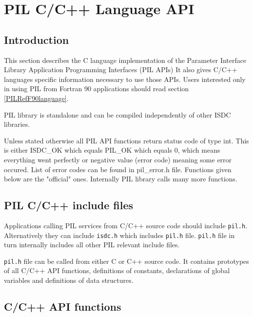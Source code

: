 \section{PIL C/C++ Language API}\label{PILRefClanguage}
%

\subsection{Introduction}\label{PILRefCintro}

This  section  describes  the  C language implementation of the
Parameter Interface Library Application Programming Interfaces (PIL APIs)
It also gives C/C++ languages specific
information necessary to use those APIs. Users interested only
in using PIL from Fortran 90 applications should read section
\ref{PILRefF90language}. 

PIL library is standalone and can be compiled independently of other ISDC
libraries.

Unless stated otherwise all PIL API functions return status code of type
int. This is either ISDC\_OK which equals PIL\_OK which equals 0, which
means everything went perfectly or negative value (error code) meaning some
error occured. List of error codes can be found in pil\_error.h file.
Functions given below are the "official" ones. Internally PIL library
calls many more functions. 	

\subsection{PIL C/C++ include files}\label{PILRefCincludes}

Applications calling PIL services from C/C++ source code should include
{\tt pil.h}. Alternatively they can include {\tt isdc.h} which includes
{\tt pil.h} file. {\tt pil.h} file in turn internally includes all other
PIL relevant include files.

{\tt pil.h} file can be called from either C or C++ source code. It contains
prototypes of all C/C++ API functions, definitions of constants,
declarations of global variables and definitions of data structures.


\subsection{C/C++ API functions}\label{PILRefCfunctions}

